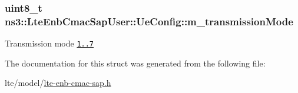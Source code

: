 \subsubsection[{\texorpdfstring{m\+\_\+transmission\+Mode}{m_transmissionMode}}]{\setlength{\rightskip}{0pt plus 5cm}uint8\+\_\+t ns3\+::\+Lte\+Enb\+Cmac\+Sap\+User\+::\+Ue\+Config\+::m\+\_\+transmission\+Mode}\hypertarget{structns3_1_1LteEnbCmacSapUser_1_1UeConfig_af5014d0254a641bc8bf84154aa4853e4}{}\label{structns3_1_1LteEnbCmacSapUser_1_1UeConfig_af5014d0254a641bc8bf84154aa4853e4}
Transmission mode \href{i.e., SISO, MIMO, etc.}{\tt 1..7} 

The documentation for this struct was generated from the following file\+:\begin{DoxyCompactItemize}
\item 
lte/model/\hyperlink{lte-enb-cmac-sap_8h}{lte-\/enb-\/cmac-\/sap.\+h}\end{DoxyCompactItemize}
